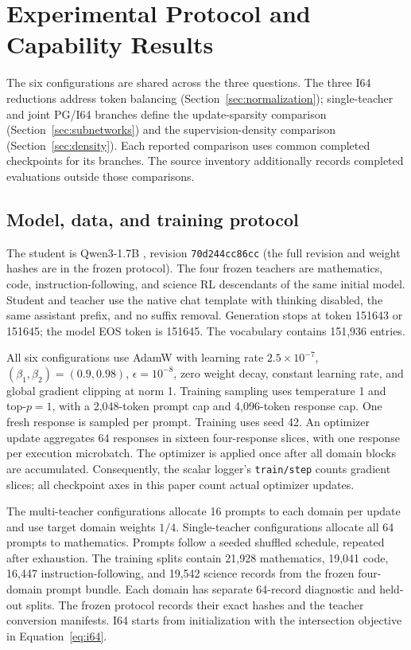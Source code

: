 \section{Experimental Protocol and Capability Results}
\label{app:setup}

The six configurations are shared across the three questions. The three I64 reductions address token balancing (Section~\ref{sec:normalization}); single-teacher and joint PG/I64 branches define the update-sparsity comparison (Section~\ref{sec:subnetworks}) and the supervision-density comparison (Section~\ref{sec:density}). Each reported comparison uses common completed checkpoints for its branches. The source inventory additionally records completed evaluations outside those comparisons.

\subsection{Model, data, and training protocol}

The student is Qwen3-1.7B \citep{qwen2025qwen3}, revision \texttt{70d244cc86cc} (the full revision and weight hashes are in the frozen protocol). The four frozen teachers are mathematics, code, instruction-following, and science RL descendants of the same initial model. Student and teacher use the native chat template with thinking disabled, the same assistant prefix, and no suffix removal. Generation stops at token 151643 or 151645; the model EOS token is 151645. The vocabulary contains 151,936 entries.

All six configurations use AdamW with learning rate $2.5\times10^{-7}$, $(\beta_1,\beta_2)=(0.9,0.98)$, $\epsilon=10^{-8}$, zero weight decay, constant learning rate, and global gradient clipping at norm 1. Training sampling uses temperature 1 and top-$p=1$, with a 2,048-token prompt cap and 4,096-token response cap. One fresh response is sampled per prompt. Training uses seed 42. An optimizer update aggregates 64 responses in sixteen four-response slices, with one response per execution microbatch. The optimizer is applied once after all domain blocks are accumulated. Consequently, the scalar logger's \texttt{train/step} counts gradient slices; all checkpoint axes in this paper count actual optimizer updates.

The multi-teacher configurations allocate 16 prompts to each domain per update and use target domain weights $1/4$. Single-teacher configurations allocate all 64 prompts to mathematics. Prompts follow a seeded shuffled schedule, repeated after exhaustion. The training splits contain 21,928 mathematics, 19,041 code, 16,447 instruction-following, and 19,542 science records from the frozen four-domain prompt bundle. Each domain has separate 64-record diagnostic and held-out splits. The frozen protocol records their exact hashes and the teacher conversion manifests. I64 starts from initialization with the intersection objective in Equation~\ref{eq:i64}.

